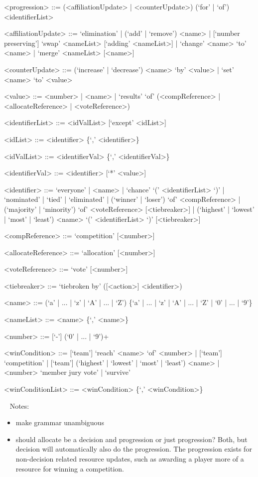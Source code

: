 \documentclass{article}
\begin{document}
\begin{grammar}
<progression> ::= (<affiliationUpdate> | <counterUpdate>) (`for' | `of') 
<identifierList>

<affiliationUpdate> ::= `elimination' | (`add' | `remove') <name> | 
[`number preserving'] `swap' <nameList> [`adding' <nameList>] | `change' <name> 
`to' <name> | `merge' <nameList> [<name>]

<counterUpdate> ::= (`increase' | `decrease') <name> `by' <value> | `set' 
<name> `to' <value> 

<value> ::= <number> | <name> | `results' `of' (<compReference> | 
<allocateReference> |
<voteReference>) %

<identifierList> ::= <idValList> [`except' <idList>]

<idList> ::= <identifier> \{`,' <identifier>\}

<idValList> ::= <identifierVal> \{`,' <identifierVal>\}

<identifierVal> ::= <identifier> [`*' <value>]

<identifier> ::= `everyone' | <name> | `chance' `(' <identifierList> `)' | 
`nominated' 
| 
`tied' | 
`eliminated' | (`winner' | `loser') `of' <compReference> | (`majority' | 
`minority') `of' <voteReference>  [<tiebreaker>] | (`highest' | `lowest' | 
`most' | `least') <name> `(' <identifierList> `)' [<tiebreaker>]

<compReference> ::= `competition' [<number>] 

<allocateReference> ::= `allocation' [<number>]

<voteReference> ::= `vote' [<number>]

<tiebreaker> ::= `tiebroken by' ([<action>] <identifier>)

<name> ::= (`a' | ... | `z' | `A' | ... | `Z') \{`a' | ... | `z' | `A' | ... | 
`Z' | `0' | ... | `9'\}

<nameList> ::= <name> \{`,' <name>\}

<number> ::= [`-'] (`0' | ... | `9')+

<winCondition> ::= [`team'] `reach' <name> `of' <number> | [`team'] 
`competition' | [`team'] (`highest' | `lowest' | `most' | `least') <name> | 
<number> `member jury vote' | `survive'

<winConditionList> ::= <winCondition> \{`,' <winCondition>\}

\end{grammar}

~\newline
Notes:
\begin{itemize}
	\item make grammar unambiguous
	\item should allocate be a decision and progression or just progression? 
	Both, but decision will automatically also do the progression. The 
	progression exists for non-decision related resource updates, such as 
	awarding a player more of a resource for winning a competition.
\end{itemize}
\end{document}
